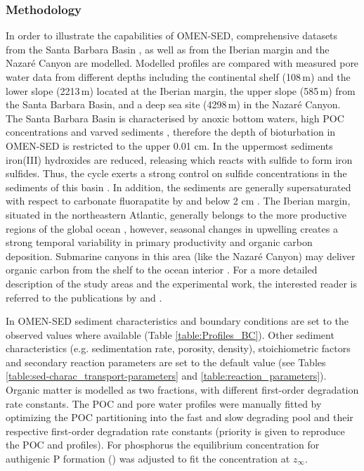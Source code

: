 \documentclass[gmd, manuscript]{copernicus}
\begin{document}
\subsubsection{Methodology}
In order to illustrate the capabilities of OMEN-SED, comprehensive datasets from the Santa Barbara Basin \citep{reimers_porewater_1996}, as well as from the Iberian margin and the Nazar\'e Canyon \citep{epping_oxidation_2002} 
are modelled. Modelled profiles are compared with measured pore water data from different depths including the continental shelf (108\,m) and the lower slope (2213\,m) located at the Iberian margin,
the upper slope (585\,m) from the Santa Barbara Basin, and a deep sea site (4298\,m) in the Nazar\'e Canyon. 
The Santa Barbara Basin is characterised by anoxic bottom waters, high POC concentrations and varved sediments \citep{reimers_seasonal_1990}, therefore the depth of bioturbation in OMEN-SED 
is restricted to the upper 0.01 cm. In the uppermost sediments iron(III) hydroxides are reduced, releasing  which reacts with sulfide to form iron sulfides. 
Thus, the  cycle exerts a strong control on sulfide concentrations in the sediments of this basin \citep{reimers_porewater_1996}. 
In addition, the sediments are generally supersaturated with respect to carbonate fluorapatite by and below 2 cm \citep{reimers_porewater_1996}. 
The Iberian margin, situated in the northeastern Atlantic, generally belongs to the more productive regions of the global ocean \citep{longhurst_estimate_1995}, however, seasonal changes in upwelling creates a strong temporal variability in 
primary productivity and organic carbon deposition. Submarine canyons in this area (like the Nazar\'e Canyon) may deliver organic carbon from the shelf to the ocean interior \citep{van_weering_recent_2002, epping_oxidation_2002}.
For a more detailed description of the study areas and the experimental work, the interested reader is referred to the publications by \citet{reimers_porewater_1996} and \citet{epping_oxidation_2002}. 

In OMEN-SED sediment characteristics and boundary conditions are set to the observed values where available (Table \ref{table:Profiles_BC}). Other sediment characteristics (e.g. sedimentation rate, porosity, density), 
stoichiometric factors and secondary reaction parameters are set to the default value (see Tables \ref{table:sed-charac_transport-parameters} and \ref{table:reaction_parameters}).
Organic matter is modelled as two fractions, with different first-order degradation rate constants. 
The POC and pore water profiles were manually fitted by optimizing the POC partitioning into the fast and slow degrading pool and their respective first-order degradation rate constants (priority is given to reproduce the POC 
and  profiles). For phosphorus the equilibrium concentration for authigenic P formation () was adjusted to fit the  concentration at $z_\infty$. 
\end{document}
